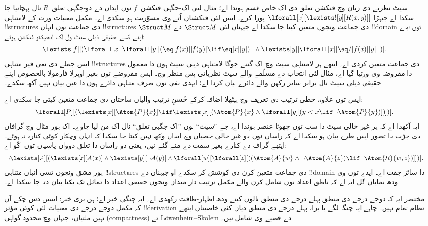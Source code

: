 \documentclass[../../../include/open-logic-section]{subfiles}
\begin{document}
سیٹ نظریے دی زبان وچ فنکشن تعلق
دی اک خاص قسم ہوندا اے؛ مثال لئی
اک-جگہی فنکشن~$f$ نوں ایداں دے
دو-جگہی تعلق~$R$ نال پہچانیا
جا سکدا اے جیہڑا
$\lforall[x][\lexists![y][R(x,y)]]$
پورا کرے۔ ایس لئی فنکشناں اُتے
وی مسوّریت ہو سکدی اے۔ مکمل
معنیات ورت کے لامتناہی
!!{structure}s دی جماعت نوں
انہاں !!{structure}s $\Struct M$
دی جماعت ونجوں متعین کیتا جا سکدا
اے جیہناں لئی $\Struct M$ دے
!!{domain} توں ایدے اپنے کسے
حقیقی ذیلی سیٹ ول اک
انجیکٹو فنکشن ہوئے:
\[
\lexists[f][(\lforall[x][\lforall[y][(\eq[f(x)][f(y)] \lif \eq[x][y])]]
  \land \lexists[y][\lforall[x][\eq/[f(x)][y]]])].
\]
ایس جملے دی نفی فیر متناہی
!!{structure}s دی جماعت متعین
کردی اے۔
ایتھے ہر لامتناہی سیٹ وچ اک گننے جوگا لامتناہی
ذیلی سیٹ ہون دا معمول دا مفروضہ وی ورتیا گیا اے،
مثال لئی انتخاب دے مسلّمے والے سیٹ نظریاتی پس منظر
وچ۔ ایس مفروضے توں بغیر اوپرلا فارمولا بالخصوص
اپنے حقیقی ذیلی سیٹ نال برابر سائز رکھن والے دائرے
بیان کردا اے؛ ایہدی نفی نوں صرف متناہی دائرے ہون
دا عین بیان نہیں آکھ سکدے۔

ایس توں علاوہ، خطی ترتیب دی
تعریف وچ ہیٹھلا اضافہ کرکے
حُسنِ ترتیب والیاں ساختاں دی
جماعت متعین کیتی جا سکدی اے:
\[
\lforall[P][(\lexists[x][\Atom{P}{x}] \lif \lexists[x][(\Atom{P}{x}
    \land \lforall[y][(y < x \lif \lnot \Atom{P}{y})])])].
\]
ایہ آکھدا اے کہ ہر غیر خالی
سیٹ دا سب توں چھوٹا عنصر ہوندا
اے، جے ”سیٹ“ نوں ”اک-جگہی
تعلق“ نال اک من لیا جاوے۔ اک
ہور مثال وچ گرافاں دی جڑت دا
تصور ایس طرح بیان ہو سکدا اے
کہ راساں نوں دو غیر خالی
حصیاں وچ ایداں وکھ نہیں
کیتا جا سکدا کہ انہاں
وچکار کوئی کنارہ نہ ہوئے۔ ایتھے گراف دے کنارے
بغیر سمت دے منے گئے نیں، یعنی دو راساں دا تعلق
دوواں پاسیاں توں اکّو اے:
\[
\lnot \lexists[A][(\lexists[x][A(x)] \land \lexists[y][\lnot A(y)]
  \land \lforall[w][\lforall[z][((\Atom{A}{w} \land \lnot \Atom{A}{z})
      \lif \lnot \Atom{R}{w,z})]])].
\]
ہور مشق ونجوں تسی انہاں متناہی
!!{structure}s دی جماعت متعین کرن
دی کوشش کر سکدے او جیہناں دے
!!{domain} دا سائز جفت اے۔
ایدے توں وی ودھ نمایاں گل ایہ
اے کہ ناطق اعداد نوں شامل کرن
والے مکمل ترتیب دار میدان ونجوں
حقیقی اعداد دا
تماثل تک یکتا بیان دتا
جا سکدا اے۔

مختصر ایہ کہ دوجے درجے دی
منطق پہلے درجے دی منطق نالوں
کیتے ودھ اظہار-طاقت رکھدی
اے۔ ایہ چنگی خبر اے؛ ہن بری
خبر: اسیں دس چکے آں کہ
مکمل دوجے درجے دی معنیات
لئی کوئی مؤثر !!{derivation}
نظام تمام نہیں۔ چاہے ایہ
چنگا لگے یا برا، پہلے درجے
دی منطق دیاں کئی خاصیتاں
ایتھے نہیں ملتیاں، جنہاں وچ
محدود گواہی (compactness) تے
L\"owenheim--Skolem دے
قضیے وی شامل نیں۔
\end{document}
